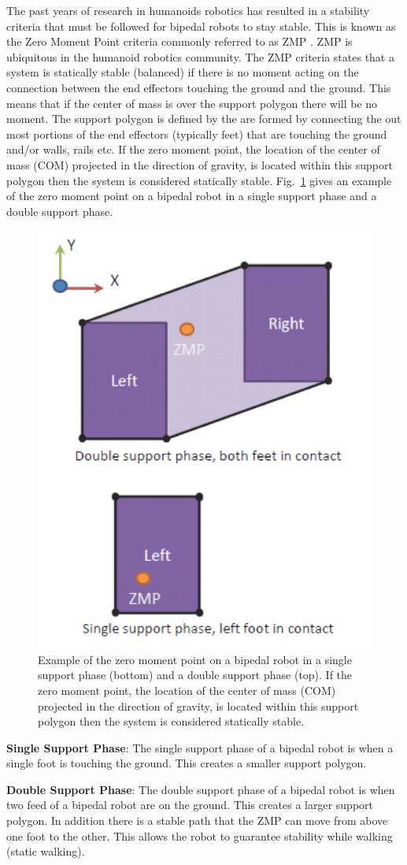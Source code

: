 The past years of research in humanoids robotics has resulted in a stability criteria that must be followed for bipedal robots to stay stable.
This is known as the Zero Moment Point criteria commonly referred to as ZMP \cite{zmp35}.
ZMP is ubiquitous in the humanoid robotics community.
The ZMP criteria states that a system is statically stable (balanced) if there is no moment acting on the connection between the end effectors touching the ground and the ground.
This means that if the center of mass is over the support polygon there will be no moment.
The support polygon is defined by the are formed by connecting the out most portions of the end effectors (typically feet) that are touching the ground and/or walls, rails etc. 
If the zero moment point, the location of the center of mass (COM) projected in the direction of gravity, is located within this support polygon then the system is considered statically stable.
Fig.~\ref{fig:zmp} gives an example of the zero moment point on a bipedal robot in a single support phase and a double support phase.


\begin{figure}[thpb]
  \centering
\includegraphics[width=0.5\columnwidth]{./background/pix/zmp.png}
  \caption{Example of the zero moment point on a bipedal robot in a single support phase (bottom) and a double support phase (top).  
If the zero moment point, the location of the center of mass (COM) projected in the direction of gravity, is located within this support polygon then the system is considered statically stable.}
  \label{fig:zmp}
\end{figure}

\noindent \textbf{Single Support Phase}:
The single support phase of a bipedal robot is when a single foot is touching the ground.
This creates a smaller support polygon.

\noindent \textbf{Double Support Phase}:
The double support phase of a bipedal robot is when two feed of a bipedal robot are on the ground.
This creates a larger support polygon.  
In addition there is a stable path that the ZMP can move from above one foot to the other.
This allows the robot to guarantee stability while walking (static walking).

